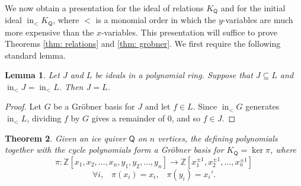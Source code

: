 \documentclass[10pt]{amsart}
\numberwithin{equation}{section}
\newtheorem{thm}{Theorem}[section]
\newtheorem{lem}[thm]{Lemma}
\theoremstyle{definition}
\theoremstyle{remark}
\DeclareMathOperator{\In}{\mathrm{in}}
\newcommand{\1}{^{-1}}
\def\ZZ{\mathbb{Z}}
\def\Q{\mathsf{Q}}
\begin{document}
\\ 
\indent We now obtain a presentation for the ideal of relations $K_\Q$ and for the initial ideal $\In_< K_\Q$, where $<$ is a monomial order in which the $y$-variables are much more expensive than the $x$-variables.
This presentation will suffice to prove Theorems \ref{thm: relations} and \ref{thm: grobner}. We first require the following standard lemma.
\begin{lem}\label{basislemma}
Let $J$ and $L$ be ideals in a polynomial ring. Suppose that $J \subseteq L$ and $\In_< J  = \In_< L$. Then $J = L$.
\end{lem}
\begin{proof}
Let $G$ be a Gr\"obner basis for $J$ and let $f \in L$. Since $\In_< G$ generates $\In_< L$, dividing $f$ by $G$ gives a remainder of $0$, and so $f \in J$.
\end{proof}
\begin{thm}\label{basisthm}
Given an ice quiver $\Q$ on $n$ vertices, the defining polynomials together with the cycle polynomials form a Gr\"obner basis for $K_\Q = \ker \pi$, where
\[ \pi :\ZZ[x_1,x_2,\dots,x_n,y_1,y_2,\dots,y_n]\longrightarrow \ZZ[x_1^{\pm1},x_2^{\pm1},\dots,x_n^{\pm1} ]\]
\[ \forall i, \;\;\; \pi(x_i) = x_i,\;\;\; \pi(y_i)=x_i'.\]
\end{thm}
\end{document}
